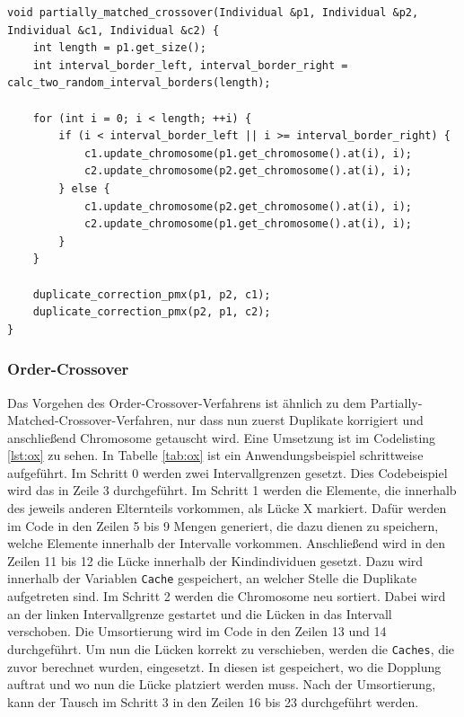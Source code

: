 \begin{minipage}{\linewidth}
\begin{lstlisting}[caption={Partially-Matched-Crossover}, firstnumber=1, captionpos=b, label=lst:pmx]
void partially_matched_crossover(Individual &p1, Individual &p2, Individual &c1, Individual &c2) { 
	int length = p1.get_size();
	int interval_border_left, interval_border_right = calc_two_random_interval_borders(length);

	for (int i = 0; i < length; ++i) {
		if (i < interval_border_left || i >= interval_border_right) {
			c1.update_chromosome(p1.get_chromosome().at(i), i);
			c2.update_chromosome(p2.get_chromosome().at(i), i);
		} else {
			c1.update_chromosome(p2.get_chromosome().at(i), i);
			c2.update_chromosome(p1.get_chromosome().at(i), i);
		}
	}

	duplicate_correction_pmx(p1, p2, c1);
	duplicate_correction_pmx(p2, p1, c2);
}
\end{lstlisting}
\end{minipage}
\subsubsection{Order-Crossover}
Das Vorgehen des Order-Crossover-Verfahrens \cite[S. 274]{schoeneburg} ist ähnlich zu dem Partially-Matched-Crossover-Verfahren, nur dass nun zuerst Duplikate korrigiert und anschließend Chromosome getauscht wird.
Eine Umsetzung ist im Codelisting \ref{lst:ox} zu sehen. In Tabelle \ref{tab:ox} ist ein Anwendungsbeispiel schrittweise aufgeführt. Im Schritt 0 werden zwei Intervallgrenzen gesetzt. Dies Codebeispiel wird das in Zeile 3 durchgeführt.
Im Schritt 1 werden die Elemente, die innerhalb des jeweils anderen Elternteils vorkommen, als Lücke X markiert. Dafür werden im Code in den Zeilen 5 bis 9 Mengen generiert, die dazu dienen zu speichern, welche Elemente innerhalb der Intervalle vorkommen.
Anschließend wird in den Zeilen 11 bis 12 die Lücke innerhalb der Kindindividuen gesetzt. Dazu wird innerhalb der Variablen \texttt{Cache} gespeichert, an welcher Stelle die Duplikate aufgetreten sind. Im Schritt 2 werden die Chromosome neu sortiert. Dabei wird an der linken Intervallgrenze gestartet und die Lücken in das Intervall verschoben. Die Umsortierung wird im Code in den Zeilen 13 und 14 durchgeführt. Um nun die Lücken korrekt zu verschieben, werden die \texttt{Caches}, die zuvor berechnet wurden, eingesetzt. In diesen ist gespeichert, wo die Dopplung auftrat und wo nun die Lücke platziert werden muss.
Nach der Umsortierung, kann der Tausch im Schritt 3 in den Zeilen 16 bis 23 durchgeführt werden.

